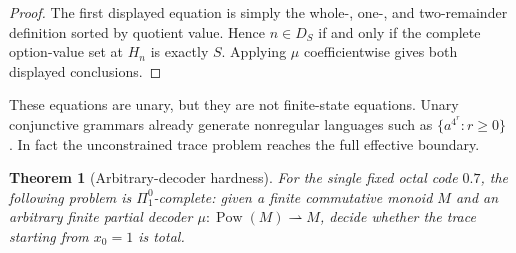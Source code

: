 \documentclass[11pt]{article}
\newtheorem{theorem}{Theorem}[section]
\theoremstyle{definition}
\theoremstyle{remark}
\newcommand{\Pow}{\operatorname{Pow}}
\begin{document}
\begin{proof}
The first displayed equation is simply the whole-, one-, and
two-remainder definition sorted by quotient value.  Hence $n\in D_S$ if and
only if the complete option-value set at $H_n$ is exactly $S$.  Applying
$\mu$ coefficientwise gives both displayed conclusions.
\end{proof}

These equations are unary, but they are not finite-state equations.  Unary
conjunctive grammars already generate nonregular languages such as
$\{a^{4^r}:r\ge0\}$ \cite{jez2008}.  In fact the unconstrained trace problem
reaches the full effective boundary.

\begin{theorem}[Arbitrary-decoder hardness]\label{thm:decoder-hardness}
For the single fixed octal code $0.7$, the following problem is
$\Pi^0_1$-complete: given a finite commutative monoid $M$ and an arbitrary
finite partial decoder $\mu:\Pow(M)\rightharpoonup M$, decide whether the trace
starting from $x_0=1$ is total.
\end{theorem}
\end{document}
